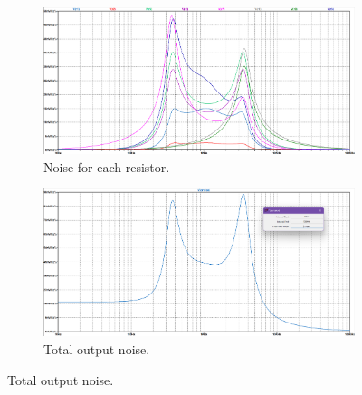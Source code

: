 \begin{figure}[H]
    \centering
    \begin{subfigure}{0.45\textwidth}
        \includegraphics*[width=\textwidth]{Images/Noise-resistencias.png}
        \caption{Noise for each resistor.}
        \label{fig:NoiseResistor}  
    \end{subfigure}
    \begin{subfigure}{0.45\textwidth}
        \includegraphics*[width=\textwidth]{Images/Noise-total.png}
        \caption{Total output noise.}
        \label{fig:NoiseTotal}    
    \end{subfigure}
\end{figure}